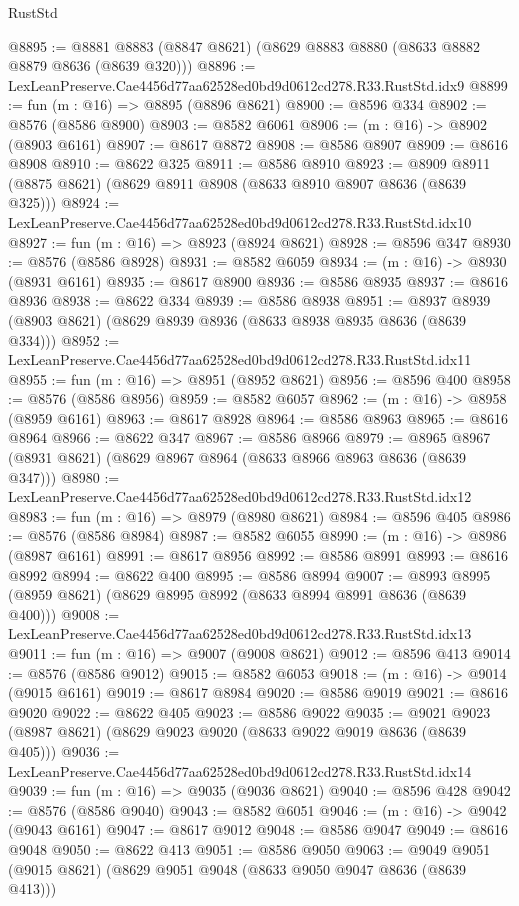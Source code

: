 \begin{lexlean}{RustStd}
\begin{coremodule}
@8895 := @8881 @8883 (@8847 @8621) (@8629 @8883 @8880 (@8633 @8882 @8879 @8636 (@8639 @320)))
@8896 := LexLeanPreserve.Cae4456d77aa62528ed0bd9d0612cd278.R33.RustStd.idx9
@8899 := fun (m : @16) => @8895 (@8896 @8621)
@8900 := @8596 @334
@8902 := @8576 (@8586 @8900)
@8903 := @8582 @6061
@8906 := (m : @16) -> @8902 (@8903 @6161)
@8907 := @8617 @8872
@8908 := @8586 @8907
@8909 := @8616 @8908
@8910 := @8622 @325
@8911 := @8586 @8910
@8923 := @8909 @8911 (@8875 @8621) (@8629 @8911 @8908 (@8633 @8910 @8907 @8636 (@8639 @325)))
@8924 := LexLeanPreserve.Cae4456d77aa62528ed0bd9d0612cd278.R33.RustStd.idx10
@8927 := fun (m : @16) => @8923 (@8924 @8621)
@8928 := @8596 @347
@8930 := @8576 (@8586 @8928)
@8931 := @8582 @6059
@8934 := (m : @16) -> @8930 (@8931 @6161)
@8935 := @8617 @8900
@8936 := @8586 @8935
@8937 := @8616 @8936
@8938 := @8622 @334
@8939 := @8586 @8938
@8951 := @8937 @8939 (@8903 @8621) (@8629 @8939 @8936 (@8633 @8938 @8935 @8636 (@8639 @334)))
@8952 := LexLeanPreserve.Cae4456d77aa62528ed0bd9d0612cd278.R33.RustStd.idx11
@8955 := fun (m : @16) => @8951 (@8952 @8621)
@8956 := @8596 @400
@8958 := @8576 (@8586 @8956)
@8959 := @8582 @6057
@8962 := (m : @16) -> @8958 (@8959 @6161)
@8963 := @8617 @8928
@8964 := @8586 @8963
@8965 := @8616 @8964
@8966 := @8622 @347
@8967 := @8586 @8966
@8979 := @8965 @8967 (@8931 @8621) (@8629 @8967 @8964 (@8633 @8966 @8963 @8636 (@8639 @347)))
@8980 := LexLeanPreserve.Cae4456d77aa62528ed0bd9d0612cd278.R33.RustStd.idx12
@8983 := fun (m : @16) => @8979 (@8980 @8621)
@8984 := @8596 @405
@8986 := @8576 (@8586 @8984)
@8987 := @8582 @6055
@8990 := (m : @16) -> @8986 (@8987 @6161)
@8991 := @8617 @8956
@8992 := @8586 @8991
@8993 := @8616 @8992
@8994 := @8622 @400
@8995 := @8586 @8994
@9007 := @8993 @8995 (@8959 @8621) (@8629 @8995 @8992 (@8633 @8994 @8991 @8636 (@8639 @400)))
@9008 := LexLeanPreserve.Cae4456d77aa62528ed0bd9d0612cd278.R33.RustStd.idx13
@9011 := fun (m : @16) => @9007 (@9008 @8621)
@9012 := @8596 @413
@9014 := @8576 (@8586 @9012)
@9015 := @8582 @6053
@9018 := (m : @16) -> @9014 (@9015 @6161)
@9019 := @8617 @8984
@9020 := @8586 @9019
@9021 := @8616 @9020
@9022 := @8622 @405
@9023 := @8586 @9022
@9035 := @9021 @9023 (@8987 @8621) (@8629 @9023 @9020 (@8633 @9022 @9019 @8636 (@8639 @405)))
@9036 := LexLeanPreserve.Cae4456d77aa62528ed0bd9d0612cd278.R33.RustStd.idx14
@9039 := fun (m : @16) => @9035 (@9036 @8621)
@9040 := @8596 @428
@9042 := @8576 (@8586 @9040)
@9043 := @8582 @6051
@9046 := (m : @16) -> @9042 (@9043 @6161)
@9047 := @8617 @9012
@9048 := @8586 @9047
@9049 := @8616 @9048
@9050 := @8622 @413
@9051 := @8586 @9050
@9063 := @9049 @9051 (@9015 @8621) (@8629 @9051 @9048 (@8633 @9050 @9047 @8636 (@8639 @413)))

\end{coremodule}
\end{lexlean}
